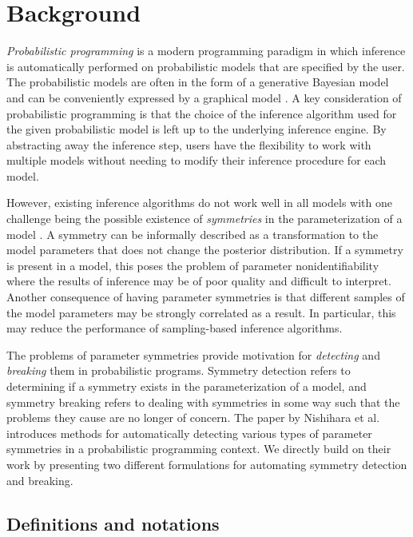 

\section{Background}

\textit{Probabilistic programming} is a modern programming paradigm in which inference is automatically performed on probabilistic models that are specified by the user. The probabilistic models are often in the form of a generative Bayesian model and can be conveniently expressed by a graphical model \cite{Rainforth:2017}. A key consideration of probabilistic programming is that the choice of the inference algorithm used for the given probabilistic model is left up to the underlying inference engine. By abstracting away the inference step, users have the flexibility to work with multiple models without needing to modify their inference procedure for each model.

However, existing inference algorithms do not work well in all models with one challenge being the possible existence of \textit{symmetries} in the parameterization of a model \cite{Nishihara:2013}. A symmetry can be informally described as a transformation to the model parameters that does not change the posterior distribution. If a symmetry is present in a model, this poses the problem of parameter nonidentifiability where the results of inference may be of poor quality and difficult to interpret. Another consequence of having parameter symmetries is that different samples of the model parameters may be strongly correlated as a result. In particular, this may reduce the performance of sampling-based inference algorithms.

The problems of parameter symmetries provide motivation for \textit{detecting} and \textit{breaking} them in probabilistic programs. Symmetry detection refers to determining if a symmetry exists in the parameterization of a model, and symmetry breaking refers to dealing with symmetries in some way such that the problems they cause are no longer of concern. The paper by Nishihara et al. \cite{Nishihara:2013} introduces methods for automatically detecting various types of parameter symmetries in a probabilistic programming context. We directly build on their work by presenting two different formulations for automating symmetry detection and breaking.


\subsection{Definitions and notations}

